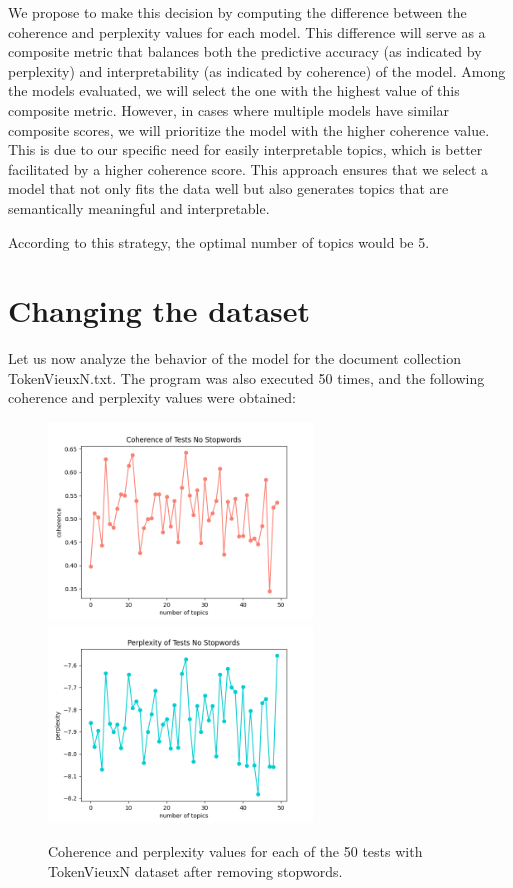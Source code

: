 \documentclass[10pt]{article} %
\begin{document}
	We propose to make this decision by computing the difference between the coherence and perplexity values for each model. This difference will serve as a composite metric that balances both the predictive accuracy (as indicated by perplexity) and interpretability (as indicated by coherence) of the model. Among the models evaluated, we will select the one with the highest value of this composite metric. However, in cases where multiple models have similar composite scores, we will prioritize the model with the higher coherence value. This is due to our specific need for easily interpretable topics, which is better facilitated by a higher coherence score. This approach ensures that we select a model that not only fits the data well but also generates topics that are semantically meaningful and interpretable.
	
	According to this strategy, the optimal number of topics would be 5.
	
	\section{Changing the dataset}
	
	Let us now analyze the behavior of the model for the document collection TokenVieuxN.txt. The program was also executed 50 times, and the following coherence and perplexity values were obtained:
	
	\begin{figure}[H]
	\centering
		\includegraphics[width=7cm]{images/coherence_no_stopwords_2}
		\includegraphics[width=7cm]{images/perplexity_no_stopwords_2}
	\caption{Coherence and perplexity values for each of the 50 tests with TokenVieuxN dataset after removing stopwords.}
\end{figure}
	
\end{document}
